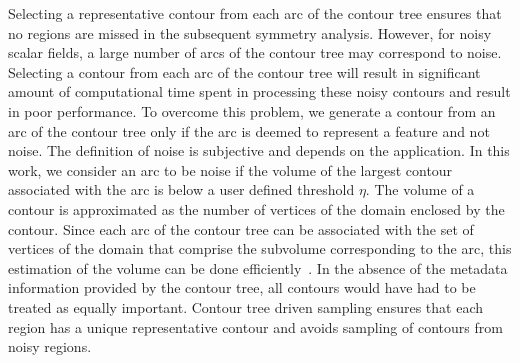 \documentclass[review,journal]{vgtc}         %
\begin{document}
Selecting a representative contour from each arc of the contour tree ensures that no regions
are missed in the subsequent symmetry analysis. However, for noisy scalar fields, a large
number of arcs of the contour tree may correspond to noise. Selecting a contour from each
arc of the contour tree will result in significant amount of computational time spent in
processing these noisy contours and result in poor performance. To overcome this problem,
we generate a contour from an arc of the contour tree only if the arc is deemed to represent
a feature and not noise. The definition of noise is subjective and depends on the application.
In this work, we consider an arc to be noise if the volume of the 
largest contour associated with the arc is below a user defined threshold $\eta$. The volume of a
contour is approximated as the number of vertices of the domain enclosed by the contour. 
Since each arc of the contour tree can be associated with the set of vertices of the domain 
that comprise the subvolume corresponding to the arc, this estimation of the volume can be done 
efficiently~\cite{CarrSP10}. In the absence of the metadata information provided by the contour tree,
all contours would have had to be treated as equally important. Contour tree driven sampling ensures
that each region has a unique representative contour and avoids sampling of contours from noisy regions.
\end{document}
